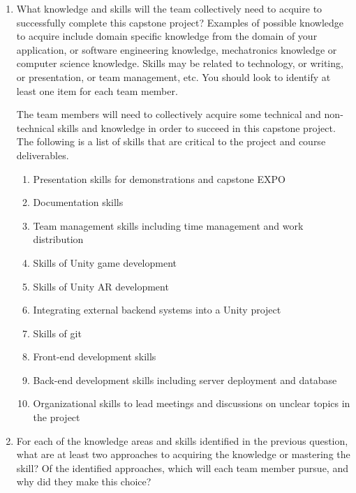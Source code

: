 \documentclass[12pt]{article}
\begin{document}
\begin{enumerate}
  \item What knowledge and skills will the team collectively need to acquire to
  successfully complete this capstone project?  Examples of possible knowledge
  to acquire include domain specific knowledge from the domain of your
  application, or software engineering knowledge, mechatronics knowledge or
  computer science knowledge.  Skills may be related to technology, or writing,
  or presentation, or team management, etc.  You should look to identify at
  least one item for each team member.
  
  
\quad The team members will need to collectively acquire some technical and non-technical skills and knowledge in order to succeed in this capstone project. The following is a list of skills that are critical to the project and course deliverables.
  \begin{enumerate}[1]
      \item Presentation skills for demonstrations and capstone EXPO
      \item Documentation skills
      \item Team management skills including time management and work distribution
      \item Skills of Unity game development
      \item Skills of Unity AR development
      \item Integrating external backend systems into a Unity project
      \item Skills of git
      \item Front-end development skills
      \item Back-end development skills including server deployment and database
      \item Organizational skills to lead meetings and discussions on unclear topics in the project
  \end{enumerate}
  
  \item For each of the knowledge areas and skills identified in the previous
  question, what are at least two approaches to acquiring the knowledge or
  mastering the skill?  Of the identified approaches, which will each team
  member pursue, and why did they make this choice?
  

\end{enumerate}
\end{document}
